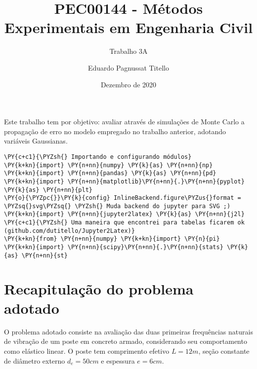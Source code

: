 

\author{Eduardo Pagnussat Titello}
\title{PEC00144 - Métodos Experimentais em Engenharia Civil}
\subtitle{Trabalho 3A}
\date{Dezembro de 2020}



	
	\maketitle


Este trabalho tem por objetivo: avaliar através de simulações de Monte
Carlo a propagação de erro no modelo empregado no trabalho anterior,
adotando variáveis Gaussianas.

    \begin{tcolorbox}[breakable, size=fbox, boxrule=1pt, pad at break*=1mm,colback=cellbackground, colframe=cellborder]
\begin{Verbatim}[commandchars=\\\{\}]
\PY{c+c1}{\PYZsh{} Importando e configurando módulos}
\PY{k+kn}{import} \PY{n+nn}{numpy} \PY{k}{as} \PY{n+nn}{np}
\PY{k+kn}{import} \PY{n+nn}{pandas} \PY{k}{as} \PY{n+nn}{pd} 
\PY{k+kn}{import} \PY{n+nn}{matplotlib}\PY{n+nn}{.}\PY{n+nn}{pyplot} \PY{k}{as} \PY{n+nn}{plt}
\PY{o}{\PYZpc{}}\PY{k}{config} InlineBackend.figure\PYZus{}format = \PYZsq{}svg\PYZsq{} \PYZsh{} Muda backend do jupyter para SVG ;)
\PY{k+kn}{import} \PY{n+nn}{jupyter2latex} \PY{k}{as} \PY{n+nn}{j2l} \PY{c+c1}{\PYZsh{} Uma maneira que encontrei para tabelas ficarem ok (github.com/dutitello/Jupyter2Latex)}
\PY{k+kn}{from} \PY{n+nn}{numpy} \PY{k+kn}{import} \PY{n}{pi}
\PY{k+kn}{import} \PY{n+nn}{scipy}\PY{n+nn}{.}\PY{n+nn}{stats} \PY{k}{as} \PY{n+nn}{st}
\end{Verbatim}
\end{tcolorbox}

    \hypertarget{recapitulauxe7uxe3o-do-problema-adotado}{%
\section{Recapitulação do problema
adotado}\label{recapitulauxe7uxe3o-do-problema-adotado}}

O problema adotado consiste na avaliação das duas primeiras frequências
naturais de vibração de um poste em concreto armado, considerando seu
comportamento como elástico linear. O poste tem comprimento efetivo
\(L=12m\), seção constante de diâmetro externo \(d_e=50cm\) e espessura
\(e=6cm\).

